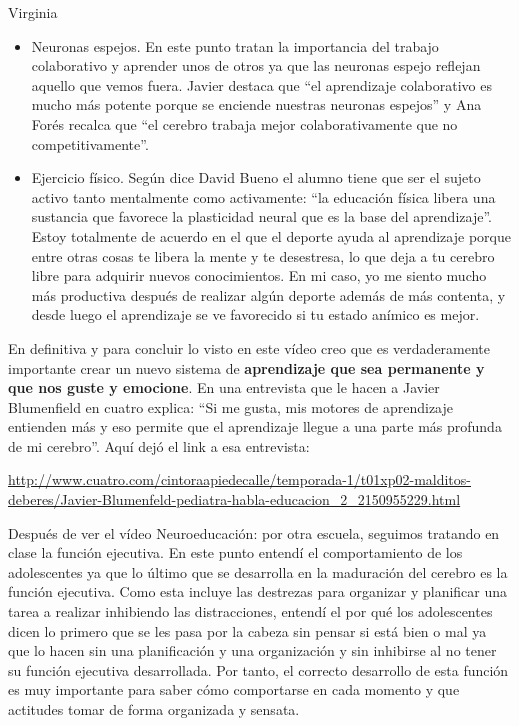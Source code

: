 \begin{opin}{\virgicolor}{Virginia}
\begin{itemize}
\item Neuronas espejos. En este punto tratan la importancia del trabajo colaborativo y aprender unos de otros ya que las neuronas espejo reflejan aquello que vemos fuera. Javier destaca que “el aprendizaje colaborativo es mucho más potente porque se enciende nuestras neuronas espejos” y Ana Forés recalca que “el cerebro trabaja mejor colaborativamente que no competitivamente”. 

 
\item Ejercicio físico. Según dice David Bueno el alumno tiene que ser el sujeto activo tanto mentalmente como activamente: “la educación física libera una sustancia que favorece la plasticidad neural que es la base del aprendizaje”. Estoy totalmente de acuerdo en el que el deporte ayuda al aprendizaje porque entre otras cosas te libera la mente y te desestresa, lo que deja a tu cerebro libre para adquirir nuevos conocimientos. En mi caso, yo me siento mucho más productiva después de realizar algún deporte además de más contenta, y desde luego el aprendizaje se ve favorecido si tu estado anímico es mejor. 

\end{itemize}


En definitiva y para concluir lo visto en este vídeo creo que es verdaderamente importante crear un nuevo sistema de \textbf{aprendizaje que sea permanente y que nos guste y emocione}. En una entrevista que le hacen a Javier Blumenfield en cuatro explica: “Si me gusta, mis motores de aprendizaje entienden más y eso permite que el aprendizaje llegue a una parte más profunda de mi cerebro”. Aquí dejó el link a esa entrevista:

\url{http://www.cuatro.com/cintoraapiedecalle/temporada-1/t01xp02-malditos-deberes/Javier-Blumenfeld-pediatra-habla-educacion_2_2150955229.html}





Después de ver el vídeo Neuroeducación: por otra escuela, seguimos tratando en clase la función ejecutiva. En este punto entendí el comportamiento de los adolescentes ya que lo último que se desarrolla en la maduración del cerebro es la función ejecutiva. Como esta incluye las destrezas para organizar y planificar una tarea a realizar inhibiendo las distracciones, entendí el por qué los adolescentes dicen lo primero que se les pasa por la cabeza sin pensar si está bien o mal ya que lo hacen sin una planificación y una organización y sin inhibirse al no tener su función ejecutiva desarrollada. Por tanto, el correcto desarrollo de esta función es muy importante para saber cómo comportarse en cada momento y que actitudes tomar de forma organizada y sensata.


\end{opin}
